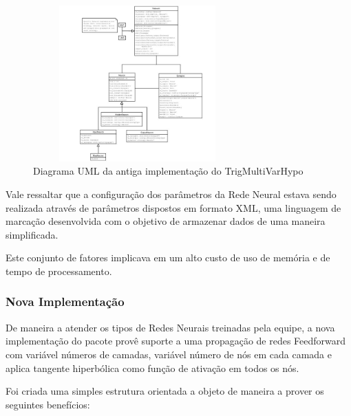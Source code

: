 \documentclass[a4paper,10pt,titlepage]{article}
\begin{document}
\begin{figure}[htbp!]
 \centering
 \includegraphics[width=8cm,height=6cm]{Figs/tmvh_refactoring/old_tmvh.jpeg}
 \caption{Diagrama UML da antiga implementação do TrigMultiVarHypo}
 \label{fig:old_tmvh}
\end{figure}

Vale ressaltar que a configuração dos parâmetros da Rede Neural estava sendo realizada através de parâmetros dispostos em formato XML, uma linguagem de marcação desenvolvida com o objetivo de armazenar dados de uma maneira simplificada.

Este conjunto de fatores implicava em um alto custo de uso de memória e de tempo de processamento.

\subsubsection{Nova Implementação}

De maneira a atender os tipos de Redes Neurais treinadas pela equipe, a nova implementação do pacote provê suporte a uma propagação de redes Feedforward com variável números de camadas, variável número de nós em cada camada e aplica tangente hiperbólica como função de ativação em todos os nós.

Foi criada uma simples estrutura orientada a objeto de maneira a prover os seguintes benefícios:
\end{document}
